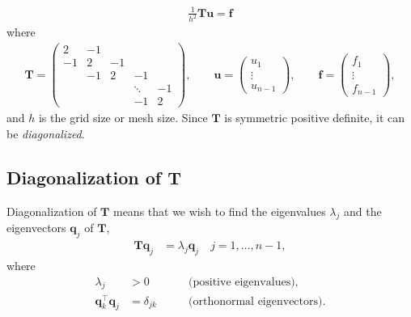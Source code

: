 \begin{align*}
  \frac{1}{h^2} \bm T \bm u = \bm f
\end{align*}
where
\begin{align*}
  \bm T =
  \begin{pmatrix}
    2 & -1 & & & \\
    -1 & 2 & -1 & & \\
    & -1 & 2 & -1 & \\
    & & & \ddots & -1 \\
    & & & -1 & 2
  \end{pmatrix} , \qquad
  \bm u =
  \begin{pmatrix}
    u_1 \\
    \vdots \\
    u_{n-1}
  \end{pmatrix} , \qquad
  \bm f =
  \begin{pmatrix}
    f_1 \\
    \vdots \\
    f_{n-1}
  \end{pmatrix},
\end{align*}
and $h$ is the grid size or mesh size. Since $\bm T$ is symmetric
positive definite, it can be \emph{diagonalized}.

\subsection{Diagonalization of $\bm T$}

Diagonalization of $\bm T$ means that we wish to find the eigenvalues
$\lambda_j$ and the eigenvectors $\bm q_j$ of $\bm T$,
\begin{align*}
  \bm T \bm q_j &= \lambda_j \bm q_j \quad j=1,\ldots,n-1,
\end{align*}
where
\begin{align*}
  \lambda_j &> 0 \qquad &\text{(positive eigenvalues)}, \\
  \bm q_k^\intercal \bm q_j &= \delta_{jk} \qquad &\text{(orthonormal eigenvectors)}.
\end{align*}

